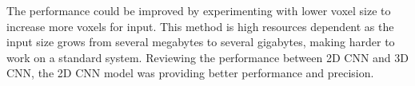 The performance could be improved by experimenting with lower voxel size to increase more voxels for input. This method is high resources dependent as the input size grows from several megabytes to several gigabytes, making harder to work on a standard system. Reviewing the performance between 2D CNN and 3D CNN, the 2D CNN model was providing better performance and precision.
